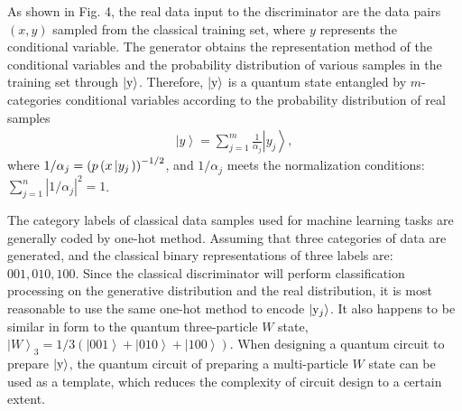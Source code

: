 \documentclass{bmcart}
\begin{document}
As shown in Fig. 4, the real data input to the discriminator are the data pairs $\left( {x,y} \right)$ sampled from the classical training set, where $y$ represents the conditional variable. The generator obtains the representation method of the conditional variables and the probability distribution of various samples in the training set through $\left| {\rm{y}} \right\rangle $. Therefore, $\left| {\rm{y}} \right\rangle $ is a quantum state entangled by $m$-categories conditional variables according to the probability distribution of real samples
%
\begin{eqnarray}\label{eqexpmuts}
\left| y \right\rangle  = \sum\limits_{j = 1}^m {\frac{1}{{{\alpha _j}}}\left| {{y_j}} \right\rangle } ,
\end{eqnarray}
%
where $1/{\alpha _j} = {\left( {p\left( {x\left| {{y_j}} \right.} \right)} \right)^{{\rm{ - }}1/2}}$, and ${1/{\alpha _j}}$ meets the normalization conditions: ${\sum\limits_{j = 1}^n {\left| {1/{\alpha _j}} \right|} ^2} = 1$.


The category labels of classical data samples used for machine learning tasks are generally coded by one-hot method. Assuming that three categories of data are generated, and the classical binary representations of three labels are: $001, 010, 100$. Since the classical discriminator will perform classification processing on the generative distribution and the real distribution, it is most reasonable to use the same one-hot method to encode $\left| {{{\rm{y}}_j}} \right\rangle $. It also happens to be similar in form to the quantum three-particle $W$ state, ${\left| W \right\rangle _3} = 1/3\left( {\left| {001} \right\rangle  + \left| {010} \right\rangle  + \left| {100} \right\rangle } \right)$. When designing a quantum circuit to prepare $\left| {\rm{y}} \right\rangle $, the quantum circuit of preparing a multi-particle $W$ state can be used as a template, which reduces the complexity of circuit design to a certain extent.
\end{document}
